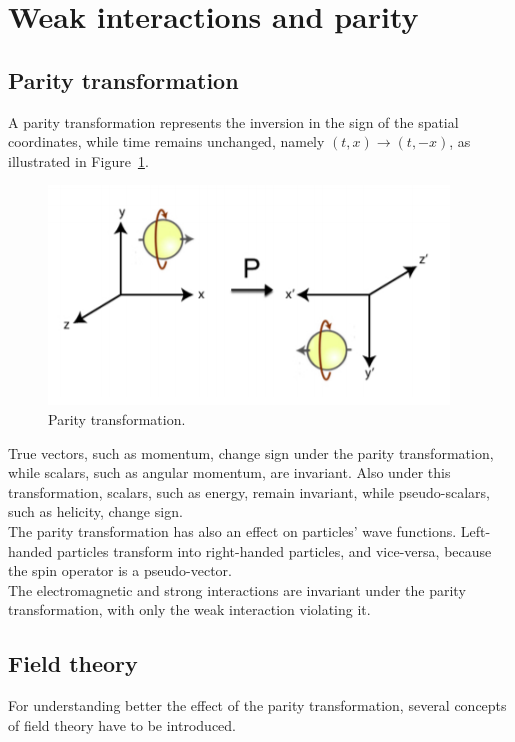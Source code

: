 \documentclass[10pt,swedish, openany]{book}
\begin{document}
\section{Weak interactions and parity}

\subsection{Parity transformation}
A parity transformation represents the inversion in the sign of the spatial coordinates, while time remains unchanged, namely $(t,x) \rightarrow (t,-x)$, as illustrated in Figure~\ref{fig:parity}.
\begin{figure}[h]
\includegraphics[scale=1]{parity.png}
\centering
\caption{Parity transformation.}
\label{fig:parity}
\end{figure}

True vectors, such as momentum, change sign under the parity transformation, while scalars, such as angular momentum, are invariant. Also under this transformation, scalars, such as energy, remain invariant, while pseudo-scalars, such as helicity, change sign.\\

The parity transformation has also an effect on particles' wave functions. Left-handed particles transform into right-handed particles, and vice-versa, because the spin operator is a pseudo-vector.\\

The electromagnetic and strong interactions are invariant under the parity transformation, with only the weak interaction violating it.\\

\subsection{Field theory}

For understanding better the effect of the parity transformation, several concepts of field theory have to be introduced.\\
\end{document}
